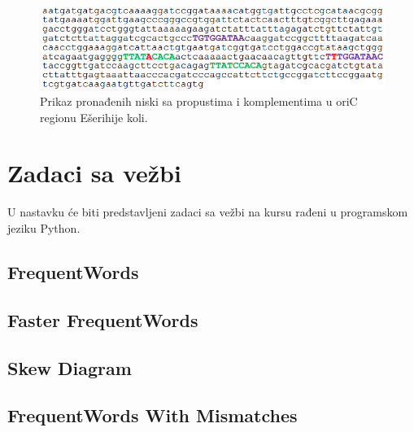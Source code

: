 \begin{figure}[h]
\caption{Prikaz pronađenih niski sa propustima i komplementima u oriC regionu Ešerihije koli.}
\centering
\includegraphics[width=1\textwidth]{poglavlja/1/slike/ecoli_poslednji.png}
\end{figure} 

\section{Zadaci sa vežbi}
U nastavku će biti predstavljeni zadaci sa vežbi na kursu rađeni u programskom jeziku Python.

\subsection{FrequentWords}



\subsection{Faster FrequentWords}



\subsection{Skew Diagram}



\subsection{FrequentWords With Mismatches}



